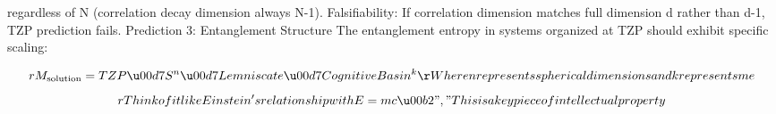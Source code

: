 
\begin{tzpsnapshot}
\end{tzpsnapshot}

regardless of N (correlation decay dimension always N-1). Falsifiability: If correlation dimension matches full dimension d rather than d-1, TZP prediction fails. Prediction 3: Entanglement Structure The entanglement entropy in systems organized at TZP should exhibit specific scaling:

\[
r M_{\mathrm{solution}} = TZP \u00d7 S^n \u00d7 Lemniscate \u00d7 CognitiveBasin^k\r Where n represents spherical dimensions and k represents me
\]
\[
r Think of it like Einstein's relationship with E=mc\u00b2","This is a key piece of intellectual property
\]

